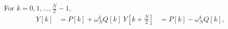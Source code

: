 For $k = 0, 1, \dots, \frac{N}{2}-1$,
\begin{align*}
Y[k] &= P[k] + \omega_N^k Q[k] \
Y[k + \frac{N}{2}] &= P[k] - \omega_N^k Q[k],
\end{align*}